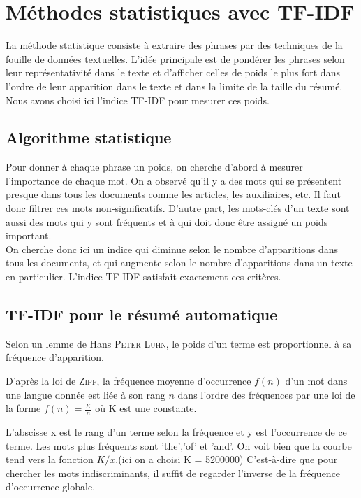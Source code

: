 \documentclass[a4paper, 12pt]{article}
\begin{document}
\section{Méthodes statistiques avec TF-IDF}\label{Section:TFIDF}

La méthode statistique consiste à extraire des phrases par des techniques de la fouille de données textuelles. L'idée principale est de pondérer les phrases selon leur représentativité dans le texte et d'afficher celles de poids le plus fort dans l'ordre de leur apparition dans le texte et dans la limite de la taille du résumé. Nous avons choisi ici l'indice TF-IDF pour mesurer ces poids.

\subsection{Algorithme statistique}

Pour donner à chaque phrase un poids, on cherche d'abord à mesurer l'importance de chaque mot. On a observé qu'il y a des mots qui se présentent presque dans tous les documents comme les articles, les auxiliaires, etc. Il faut donc filtrer ces mots non-significatifs. D'autre part, les mots-clés d'un texte sont aussi des mots qui y sont fréquents et à qui doit donc être assigné un poids important.\\

On cherche donc ici un indice qui diminue selon le nombre d'apparitions dans tous les documents, et qui augmente selon le nombre d'apparitions dans un texte en particulier. L'indice TF-IDF satisfait exactement ces critères.


\subsection{TF-IDF pour le résumé automatique}\label{Subsection:TFIDFResume}
Selon un lemme de Hans \textsc{Peter Luhn}, le poids d'un terme est proportionnel à sa fréquence d'apparition.

D'après la loi de \textsc{Zipf}, la fréquence moyenne d'occurrence $f(n)$ d'un mot dans une langue donnée est liée à son rang $n$ dans l'ordre des fréquences par une loi de la forme $f(n) = \frac{K}{n} $ où K est une constante.


L'abscisse x est le rang d'un terme selon la fréquence et y est l'occurrence de ce terme. Les mots plus fréquents sont 'the','of' et 'and'. On voit bien que la courbe tend vers la fonction $K/x$.(ici on a choisi K = 5200000) C'est-à-dire que pour chercher les mots indiscriminants, il suffit de regarder l'inverse de la fréquence d'occurrence globale.
\end{document}
